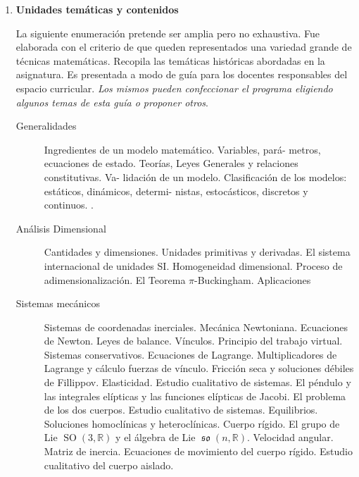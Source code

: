 \documentclass[12pt]{article}
\DeclareMathOperator{\anti}{\mathfrak{so}}
\DeclareMathOperator{\SO}{SO}
\begin{document}
\begin{enumerate}
\begin{description}
\end{description}

  \item \textbf{Unidades temáticas y contenidos}

  La siguiente enumeración pretende ser amplia pero no exhaustiva. Fue elaborada con el criterio de que queden representados una variedad grande de técnicas matemáticas. Recopila las temáticas históricas abordadas en la asignatura. Es presentada a modo de guía para los docentes responsables del espacio curricular. \emph{Los mismos pueden confeccionar el programa eligiendo algunos temas de esta guía o proponer otros}. 
  
  
  

\begin{description}


\item[Generalidades]  Ingredientes de un modelo matemático. Variables, pará-
metros, ecuaciones de estado. Teorías, Leyes Generales y relaciones constitutivas. Va-
lidación de un modelo. Clasificación de los modelos: estáticos, dinámicos, determi-
nistas, estocásticos, discretos y continuos.  \cite{bellomo1994modelling,SandipBanerjee729,MattiHeilio730}.


\item[Análisis Dimensional] Cantidades y dimensiones.  Unidades primitivas y derivadas. El sistema internacional de unidades SI. Homogeneidad dimensional. Proceso de adimensionalización. El Teorema $\pi$-Buckingham. Aplicaciones
\cite{ThomasWitelski711,MattiHeilio730,MarkH.Holmes706,CliveDym710,EdwardA.Bender715,C.C.Lin720}


\item[Sistemas mecánicos] Sistemas de coordenadas inerciales. Mecánica Newtoniana. Ecuaciones de Newton. Leyes de balance. Vínculos. Principio del trabajo virtual. Sistemas conservativos. Ecuaciones de Lagrange. Multiplicadores de Lagrange y cálculo fuerzas de vínculo. Fricción seca y soluciones débiles de Fillippov. Elasticidad. Estudio cualitativo de sistemas. El péndulo y las integrales elípticas y las funciones elípticas de Jacobi. El problema de los dos cuerpos. Estudio cualitativo  de sistemas. Equilibrios. Soluciones homoclínicas y heteroclínicas. Cuerpo rígido. El grupo de Lie  $\SO(3,\mathbb{R})$ y el álgebra de Lie $\anti(n,\mathbb{R})$. Velocidad angular. Matriz de inercia. Ecuaciones de movimiento del cuerpo rígido. Estudio cualitativo del cuerpo aislado. \cite{CliveDym710,lemos2007mecanica,DavidBetounes488,goldstein1987mecanica,arnold2007mathematical,arnold2013mathematical, NicolaBellomo725} 


\end{description}
\end{enumerate}
\end{document}
